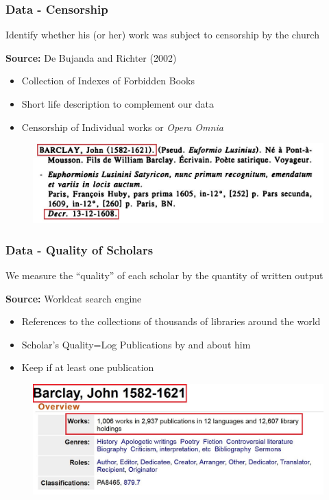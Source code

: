 \documentclass[aspectratio=169,red,12pt]{beamer}
\begin{document}
\begin{frame}
	\frametitle{Data - Censorship}
	Identify whether his (or her) work was subject to censorship by the church	
	
	\hspace{0.1cm}	
	
   \textbf{Source:} De Bujanda and Richter (2002)\vspace{0.15cm}
	\begin{itemize}
		\item Collection of Indexes of Forbidden Books
		\item Short life description to complement our data
		\item Censorship of Individual works or \textit{Opera Omnia}
	\end{itemize}
	\hspace{0.3cm}

			\begin{figure}[p]
				\includegraphics[width=0.75\linewidth]{librhorum}
			\end{figure}


	
\end{frame}

\begin{frame}
	\frametitle{Data - Quality of Scholars}
	We measure the “quality” of each scholar by the quantity of
	written output\vspace{0.2cm}
	
	\textbf{Source:} Worldcat search engine\vspace{0.1cm}
		\begin{itemize}
		\item References to the collections
		of thousands of libraries around the world
		\item Scholar's Quality=Log Publications by and about him
		\item Keep if at least one publication\vspace{0.1cm}
	\end{itemize}

			\begin{figure}[p]
				\includegraphics[width=0.62\linewidth]{worldcat}\\
			\end{figure}
		

	
\end{frame}
\end{document}

